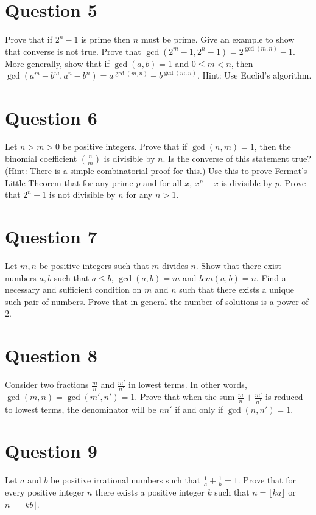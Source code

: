 \documentclass[12pt]{report}
\begin{document}
\section*{Question 5}
Prove that if $2^{n} - 1$ is prime then $n$ must be prime. Give an example to show that converse is not true. Prove that $\gcd(2^{m} - 1, 2^{n} - 1) = 2^{\gcd(m, n)} - 1$. More generally, show that if $\gcd(a, b) = 1$ and $0 \leq m < n$, then $\gcd(a^m - b^m, a^n - b^n) = a^{\gcd(m, n)} - b^{\gcd(m, n)}$. Hint: Use Euclid's algorithm.
\section*{Question 6}
Let $n > m > 0$ be positive integers. Prove that if $\gcd(n, m) = 1$, then the binomial coefficient $\binom{n}{m}$ is divisible by $n$. Is the converse of this statement true? (Hint: There is a simple combinatorial proof for this.) Use this to prove Fermat's Little Theorem that for any prime $p$ and for all $x$, $x^{p} - x$ is divisible by $p$. Prove that $2^n - 1$ is not divisible by $n$ for any $n > 1$.
\section*{Question 7}
Let $m, n$ be positive integers such that $m$ divides $n$. Show that there exist numbers $a, b$ such that $a \leq b$, $\gcd(a, b) = m$ and $lcm(a, b) = n$. Find a necessary and sufficient condition on $m$ and $n$ such that there exists a unique such pair of numbers. Prove that in general the number of solutions is a power of $2$.
\section*{Question 8}
Consider two fractions $\frac{m}{n}$ and $\frac{m'}{n'}$ in lowest terms. In other words, $\gcd(m, n) = \gcd(m', n') = 1$. Prove that when the sum $\frac{m}{n} + \frac{m'}{n'}$ is reduced to lowest terms, the denominator will be $nn'$ if and only if $\gcd(n, n') = 1$.
\section*{Question 9}
Let $a$ and $b$ be positive irrational numbers such that $\frac{1}{a} + \frac{1}{b} = 1$. Prove that for every positive integer $n$ there exists a positive integer $k$ such that $n = \lfloor ka\rfloor$ or $n = \lfloor kb \rfloor$.
\end{document}
